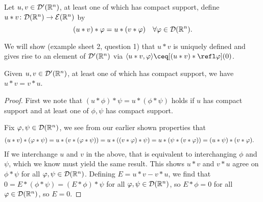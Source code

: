 \begin{definition}
	Let $u, v \in \mathcal D'(\mathbb R^n)$, at least one of which has compact support, define $u * v \colon \mathcal D(\mathbb R^n) \to \mathcal E(\mathbb R^n)$ by
	\[
	(u * v) * \varphi = u * (v * \varphi) \quad \forall \varphi \in \mathcal D(\mathbb R^n). 
	\]
\end{definition}
We will show (example sheet 2, question 1) that $u * v$ is uniquely defined and gives rise to an element of $\mathcal D'(\mathbb R^n)$ via $\ang{u * v, \phi} \ceq [(u * v) * \refl\phi](0)$. 

\begin{lemma}
	Given $u, v \in \mathcal D'(\mathbb R^n)$, at least one of which has compact support, we have $u * v = v * u$. 
\end{lemma}

\begin{proof}
	First we note that $(u * \phi) * \psi = u * (\phi * \psi)$ holds if $u$ has compact support and at least one of $\phi, \psi$ has compact support. 
	
	Fix $\varphi, \psi \in \mathcal D(\mathbb R^n)$, we see from our earlier shown properties that 
	\begin{align*}
	(u * v) * (\varphi * \psi) &= u * \qty(v * (\varphi * \psi)) = u * ((v * \varphi) * \psi) = u * (\psi * (v * \varphi)) = (u * \psi) * (v * \varphi).
	\end{align*}
	If we interchange $u$ and $v$ in the above, that is equivalent to interchanging $\phi$ and $\psi$, which we know must yield the same result. This shows $u * v$ and $v * u$ agree on $\phi * \psi$ for all $\varphi, \psi \in \mathcal D(\mathbb R^n)$. Defining $E = u * v - v * u$, we find that $0 = E * (\phi * \psi) = (E * \phi) * \psi$ for all $\varphi, \psi \in \mathcal D(\mathbb R^n)$, so $E * \phi = 0$ for all $\varphi \in \mathcal D(\mathbb R^n)$, so $E = 0$. 
\end{proof}